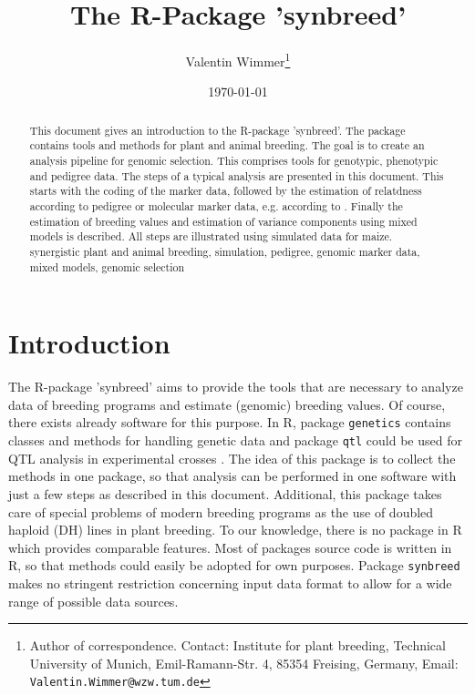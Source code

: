 \documentclass[a4paper,11pt]{article}
\title{The R-Package 'synbreed'}
\author{
Valentin Wimmer\thanks{Author of correspondence. Contact: Institute for plant breeding, Technical University of Munich, Emil-Ramann-Str. 4,
	85354 Freising, Germany, Email: \texttt{Valentin.Wimmer@wzw.tum.de}}\\
} \date{\today}
\begin{document}






\maketitle


\begin{abstract}
  \noindent This document gives an introduction to the R-package
  'synbreed'. The package contains tools and methods for plant and animal breeding. The goal is to create an analysis pipeline for genomic selection. This comprises tools
  for genotypic, phenotypic and pedigree data. The steps of a typical analysis are presented in this document. This starts with the coding of the marker data, followed by the estimation of relatdness according
  to pedigree or molecular marker data, e.g. according to \citet{vanRaden2008}. Finally the estimation of breeding values and estimation of variance components using mixed models is described. 
  All steps are illustrated using simulated data for maize.\\

   synergistic plant and animal breeding, simulation, pedigree, genomic marker data, mixed models, genomic selection
  

  
\end{abstract}


\section{Introduction}\label{sec:Introduction}

The R-package 'synbreed' aims to provide the tools that are necessary to analyze data of breeding programs and estimate (genomic) breeding values. Of course,
there exists already software for this purpose. In R, package \texttt{genetics} contains classes and methods for handling genetic data \citep{Warnes2003} and package \texttt{qtl} could be used for QTL analysis in experimental crosses \citep{Broman2003}.  The idea of this package is to collect the methods in one package, so that analysis can be performed in one software with just a few steps as described in this document. 
Additional, this package takes care of special problems of modern breeding programs as the use of doubled haploid (DH) lines in plant breeding.  To our knowledge, there is no package in R which provides comparable features. Most of packages source code is written in R, so that methods could 
easily be adopted for own purposes. Package \texttt{synbreed} makes no stringent restriction concerning input data format to allow for a wide range of possible data sources.
\end{document}
